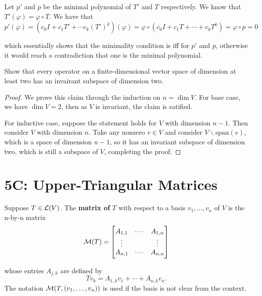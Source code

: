 \documentclass{extarticle}
\begin{document}
Let \(p'\) and \(p\) be the minimal polynomial of \(T'\) and \(T\) respectively. We know that \(T'(\varphi)
= \varphi \circ T\). We have that  
\[p'(\varphi) = (c_0 I + c_1 T' + \cdots c_k(T')^k)(\varphi) 
= \varphi \circ (c_0 I + c_1 T + \cdots + c_k T^k) = \varphi \circ p = 0\]

which essentially shows that the minimality condition is iff for \(p'\) and \(p\), otherwise it would reach 
a contradiction that one is the minimal polynomial.



\begin{problem}{29}
    Show that every operator on a finite-dimensional vector space of dimension at least two has an 
    invairant subspace of dimension two. 
\end{problem}

\begin{proof}
We prove this claim through the induction on \(n = \dim V\). For base case, we have \(\dim V = 2\), then as 
\(V\) is invariant, the claim is satified. 

For inductive case, suppose the statement holds for \(V\) with dimension \(n-1\). Then consider \(V\) with 
dimension \(n\). Take any nonzero \(v \in V\) and consider \(V \backslash \text{span}(v)\), which is a space of 
dimension \(n - 1\), so it has an invariant subspace of dimension two, which is still a subspace of \(V\), 
completing the proof.
\end{proof}




\newpage 
\section*{5C: Upper-Triangular Matrices}

\begin{definition}
    Suppose \(T \in \mathcal{L}(V)\). The \textbf{matrix of} \(T\) with respect to a basis 
    \(v_1, \ldots, v_n\) of \(V\) is the n-by-n matrix 
    \[\mathcal{M}(T) = \begin{bmatrix}
        A_{1,1} & \cdots & A_{1, n} \\ 
        \vdots &  & \vdots  \\ 
        A_{n, 1} & \cdots & A_{n,n}
    \end{bmatrix}\]

    whose entries \(A_{j, k}\) are defined by 
    \[Tv_k = A_{1, k}v_1 + \cdots + A_{n, k} v_n .\]
    The notation \(\mathcal{M}(T, (v_1, \ldots, v_n))\) is used if the basis is not clear from the context. 
\end{definition}
\end{document}
